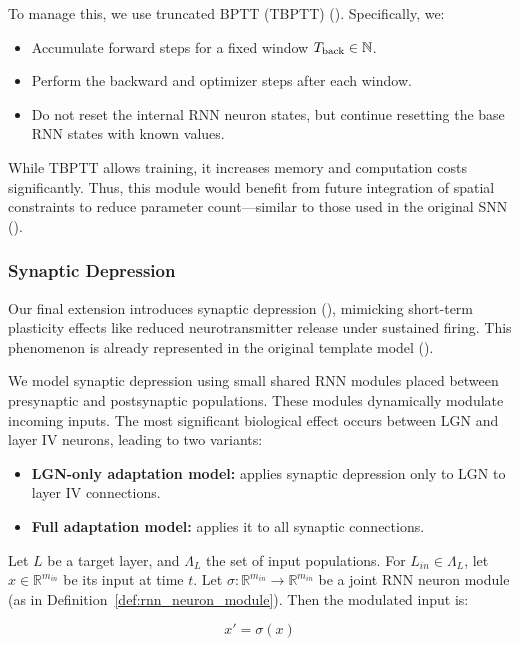To manage this, we use truncated BPTT (TBPTT) (\citet{Williams1990tbptt}). Specifically, we:
\begin{itemize}
    \item Accumulate forward steps for a fixed window $T_{\text{back}} \in \mathbb{N}$.
    \item Perform the backward and optimizer steps after each window.
    \item Do not reset the internal RNN neuron states, but continue resetting the base RNN states with known values.
\end{itemize}

While TBPTT allows training, it increases memory and computation costs significantly. Thus, this module would benefit from future integration of spatial constraints to reduce parameter count—similar to those used in the original SNN (\citet{antolik2024comprehensive}).


\subsubsection{Synaptic Depression}
\label{subsubsec:synaptic_depression}

Our final extension introduces synaptic depression (\citet{abbott1997syndepression}), mimicking short-term plasticity effects like reduced neurotransmitter release under sustained firing. This phenomenon is already represented in the original template model (\citet{antolik2024comprehensive}).

We model synaptic depression using small shared RNN modules placed between presynaptic and postsynaptic populations. These modules dynamically modulate incoming inputs. The most significant biological effect occurs between LGN and layer IV neurons, leading to two variants:
\begin{itemize}
    \item \textbf{LGN-only adaptation model:} applies synaptic depression only to LGN to layer IV connections.
    \item \textbf{Full adaptation model:} applies it to all synaptic connections.
\end{itemize}

\begin{defn}
    Let $L$ be a target layer, and $\Lambda_L$ the set of input populations. For $L_{in} \in \Lambda_L$, let $x \in \mathbb{R}^{m_{in}}$ be its input at time $t$. Let $\sigma: \mathbb{R}^{m_{in}} \to \mathbb{R}^{m_{in}}$ be a joint RNN neuron module (as in Definition~\ref{def:rnn_neuron_module}). Then the modulated input is:
    
    $$x' = \sigma(x)$$
\end{defn}
\label{def:synaptic_depression}

